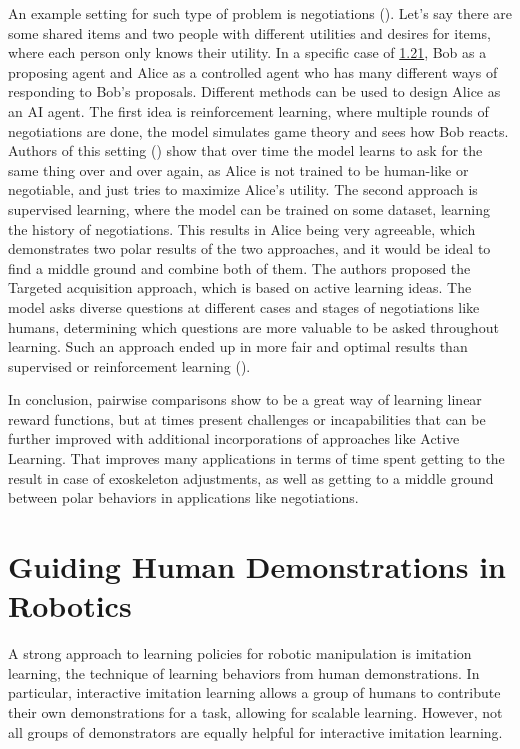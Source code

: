 \documentclass[
  letterpaper,
  DIV=11,
  numbers=noendperiod,
  oneside]{scrreprt}
\theoremstyle{remark}
\begin{document}
An example setting for such type of problem is negotiations
(). Let's say there are
some shared items and two people with different utilities and desires
for items, where each person only knows their utility. In a specific
case of \hyperref[fig:negotiation]{1.21}, Bob as a proposing agent and
Alice as a controlled agent who has many different ways of responding to
Bob's proposals. Different methods can be used to design Alice as an AI
agent. The first idea is reinforcement learning, where multiple rounds
of negotiations are done, the model simulates game theory and sees how
Bob reacts. Authors of this setting
() show that over time
the model learns to ask for the same thing over and over again, as Alice
is not trained to be human-like or negotiable, and just tries to
maximize Alice's utility. The second approach is supervised learning,
where the model can be trained on some dataset, learning the history of
negotiations. This results in Alice being very agreeable, which
demonstrates two polar results of the two approaches, and it would be
ideal to find a middle ground and combine both of them. The authors
proposed the Targeted acquisition approach, which is based on active
learning ideas. The model asks diverse questions at different cases and
stages of negotiations like humans, determining which questions are more
valuable to be asked throughout learning. Such an approach ended up in
more fair and optimal results than supervised or reinforcement learning
().

In conclusion, pairwise comparisons show to be a great way of learning
linear reward functions, but at times present challenges or
incapabilities that can be further improved with additional
incorporations of approaches like Active Learning. That improves many
applications in terms of time spent getting to the result in case of
exoskeleton adjustments, as well as getting to a middle ground between
polar behaviors in applications like negotiations.

\section{Guiding Human Demonstrations in
Robotics}\label{guiding-human-demonstrations-in-robotics}

A strong approach to learning policies for robotic manipulation is
imitation learning, the technique of learning behaviors from human
demonstrations. In particular, interactive imitation learning allows a
group of humans to contribute their own demonstrations for a task,
allowing for scalable learning. However, not all groups of demonstrators
are equally helpful for interactive imitation learning.
\end{document}
